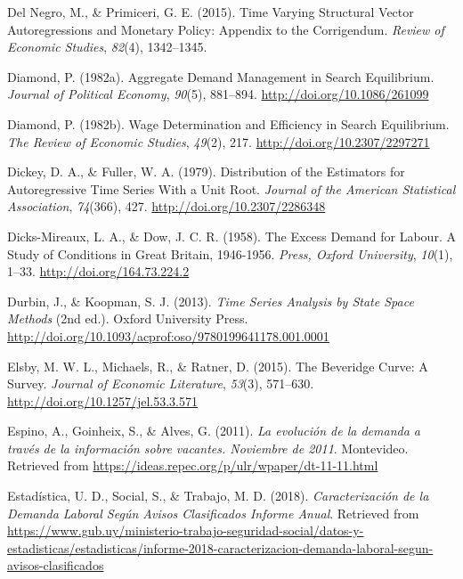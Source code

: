 \documentclass[12pt,oneside]{reedthesis}
\begin{document}
\leavevmode\hypertarget{ref-DelNegro2015}{}%
Del Negro, M., \& Primiceri, G. E. (2015). Time Varying Structural Vector Autoregressions and Monetary Policy: Appendix to the Corrigendum. \emph{Review of Economic Studies}, \emph{82}(4), 1342--1345.

\leavevmode\hypertarget{ref-Diamond1982}{}%
Diamond, P. (1982a). Aggregate Demand Management in Search Equilibrium. \emph{Journal of Political Economy}, \emph{90}(5), 881--894. \url{http://doi.org/10.1086/261099}

\leavevmode\hypertarget{ref-Diamond1982B}{}%
Diamond, P. (1982b). Wage Determination and Efficiency in Search Equilibrium. \emph{The Review of Economic Studies}, \emph{49}(2), 217. \url{http://doi.org/10.2307/2297271}

\leavevmode\hypertarget{ref-DickeyFuller1979}{}%
Dickey, D. A., \& Fuller, W. A. (1979). Distribution of the Estimators for Autoregressive Time Series With a Unit Root. \emph{Journal of the American Statistical Association}, \emph{74}(366), 427. \url{http://doi.org/10.2307/2286348}

\leavevmode\hypertarget{ref-Dicks-Mireaux1958}{}%
Dicks-Mireaux, L. A., \& Dow, J. C. R. (1958). The Excess Demand for Labour. A Study of Conditions in Great Britain, 1946-1956. \emph{Press, Oxford University}, \emph{10}(1), 1--33. \url{http://doi.org/164.73.224.2}

\leavevmode\hypertarget{ref-Durbin2013}{}%
Durbin, J., \& Koopman, S. J. (2013). \emph{Time Series Analysis by State Space Methods} (2nd ed.). Oxford University Press. \url{http://doi.org/10.1093/acprof:oso/9780199641178.001.0001}

\leavevmode\hypertarget{ref-Elsby2015}{}%
Elsby, M. W. L., Michaels, R., \& Ratner, D. (2015). The Beveridge Curve: A Survey. \emph{Journal of Economic Literature}, \emph{53}(3), 571--630. \url{http://doi.org/10.1257/jel.53.3.571}

\leavevmode\hypertarget{ref-Alma2011}{}%
Espino, A., Goinheix, S., \& Alves, G. (2011). \emph{La evolución de la demanda a través de la información sobre vacantes. Noviembre de 2011}. Montevideo. Retrieved from \url{https://ideas.repec.org/p/ulr/wpaper/dt-11-11.html}

\leavevmode\hypertarget{ref-MTSS2018}{}%
Estadística, U. D., Social, S., \& Trabajo, M. D. (2018). \emph{Caracterización de la Demanda Laboral Según Avisos Clasificados Informe Anual}. Retrieved from \url{https://www.gub.uy/ministerio-trabajo-seguridad-social/datos-y-estadisticas/estadisticas/informe-2018-caracterizacion-demanda-laboral-segun-avisos-clasificados}
\end{document}
